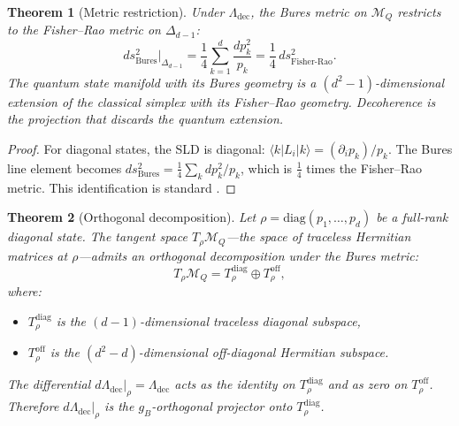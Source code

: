 \documentclass[12pt,a4paper]{article}
\newtheorem{theorem}{Theorem}[section]
\theoremstyle{definition}
\theoremstyle{remark}
\begin{document}
\begin{theorem}[Metric restriction]
\label{thm:metric-restriction}
Under $\Lambda_{\mathrm{dec}}$, the Bures metric on $\mathcal{M}_Q$ restricts to the Fisher--Rao metric on $\Delta_{d-1}$:
\begin{equation}
\label{eq:metric-restriction}
ds^2_{\mathrm{Bures}}\big|_{\Delta_{d-1}} = \frac{1}{4} \sum_{k=1}^d \frac{dp_k^2}{p_k} = \frac{1}{4}\, ds^2_{\mathrm{Fisher\text{-}Rao}}.
\end{equation}
The quantum state manifold with its Bures geometry is a $(d^2 - 1)$-dimensional extension of the classical simplex with its Fisher--Rao geometry. Decoherence is the projection that discards the quantum extension.
\end{theorem}

\begin{proof}
For diagonal states, the SLD is diagonal: $\langle k|L_i|k\rangle = (\partial_i p_k)/p_k$.  The Bures line element becomes $ds^2_{\mathrm{Bures}} = \frac{1}{4}\sum_k dp_k^2/p_k$, which is $\frac{1}{4}$ times the Fisher--Rao metric.  This identification is standard \cite{braunstein1994statistical}.
\end{proof}

\begin{theorem}[Orthogonal decomposition]
\label{thm:orthogonal-decomposition}
Let $\rho = \mathrm{diag}(p_1, \ldots, p_d)$ be a full-rank diagonal state.  The tangent space $T_\rho \mathcal{M}_Q$---the space of traceless Hermitian matrices at $\rho$---admits an orthogonal decomposition under the Bures metric:
\begin{equation}
\label{eq:orthogonal-decomposition}
T_\rho \mathcal{M}_Q = T_\rho^{\mathrm{diag}} \oplus T_\rho^{\mathrm{off}},
\end{equation}
where:
\begin{itemize}
\item $T_\rho^{\mathrm{diag}}$ is the $(d-1)$-dimensional traceless diagonal subspace,
\item $T_\rho^{\mathrm{off}}$ is the $(d^2-d)$-dimensional off-diagonal Hermitian subspace.
\end{itemize}
The differential $d\Lambda_{\mathrm{dec}}|_\rho = \Lambda_{\mathrm{dec}}$ acts as the identity on $T_\rho^{\mathrm{diag}}$ and as zero on $T_\rho^{\mathrm{off}}$.  Therefore $d\Lambda_{\mathrm{dec}}|_\rho$ is the $g_B$-orthogonal projector onto $T_\rho^{\mathrm{diag}}$.
\end{theorem}
\end{document}
